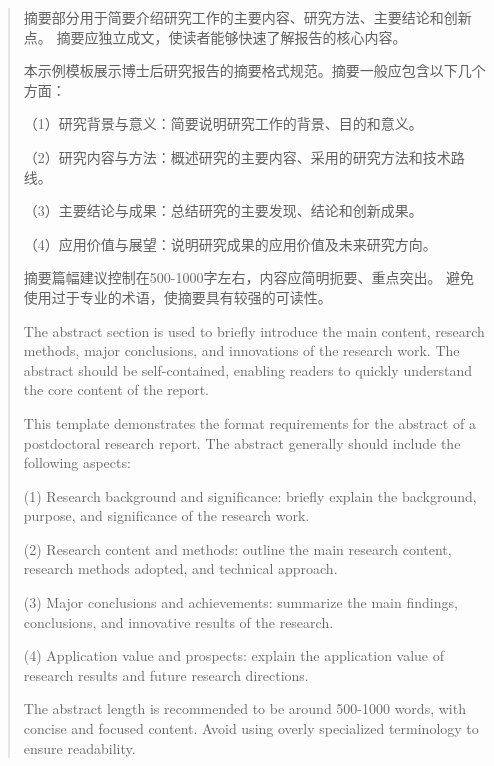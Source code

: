 \begin{abstract}
摘要部分用于简要介绍研究工作的主要内容、研究方法、主要结论和创新点。
摘要应独立成文，使读者能够快速了解报告的核心内容。

本示例模板展示博士后研究报告的摘要格式规范。摘要一般应包含以下几个方面：

（1）研究背景与意义：简要说明研究工作的背景、目的和意义。

（2）研究内容与方法：概述研究的主要内容、采用的研究方法和技术路线。

（3）主要结论与成果：总结研究的主要发现、结论和创新成果。

（4）应用价值与展望：说明研究成果的应用价值及未来研究方向。

摘要篇幅建议控制在500-1000字左右，内容应简明扼要、重点突出。
避免使用过于专业的术语，使摘要具有较强的可读性。


\begin{englishabstract}
    The abstract section is used to briefly introduce the main content, 
    research methods, major conclusions, and innovations of the research work. 
    The abstract should be self-contained, enabling readers to quickly 
    understand the core content of the report.
    
    This template demonstrates the format requirements for the abstract 
    of a postdoctoral research report. The abstract generally should 
    include the following aspects:
    
    (1) Research background and significance: briefly explain the background, 
    purpose, and significance of the research work.
    
    (2) Research content and methods: outline the main research content, 
    research methods adopted, and technical approach.
    
    (3) Major conclusions and achievements: summarize the main findings, 
    conclusions, and innovative results of the research.
    
    (4) Application value and prospects: explain the application value 
    of research results and future research directions.
    
    The abstract length is recommended to be around 500-1000 words, 
    with concise and focused content. Avoid using overly specialized 
    terminology to ensure readability.
    
\end{englishabstract}
\end{abstract}